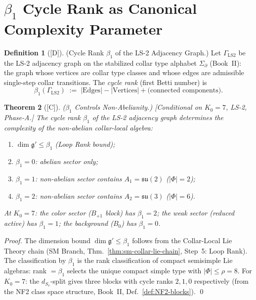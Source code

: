 \documentclass[12pt,oneside]{amsbook}
\theoremstyle{plain}
\newtheorem{theorem}{Theorem}[section]
\theoremstyle{definition}
\newtheorem{definition}[theorem]{Definition}
\theoremstyle{remark}
\newcommand{\status}[1]{\textup{[#1]}}
\begin{document}
\section{$\beta_1$ Cycle Rank as Canonical Complexity Parameter}
\label{sec:beta1}

\begin{definition}[\status{D}]\label{def:cycle-rank}
\textup{(Cycle Rank $\beta_1$ of the LS-2 Adjacency Graph.)}
Let $\Gamma_{\mathrm{LS2}}$ be the LS-2 adjacency graph on the
stabilized collar type alphabet $\Sigma_\partial$ (Book~II):
the graph whose vertices are collar type classes and whose edges
are admissible single-step collar transitions.  The
\emph{cycle rank} (first Betti number) is
\[
  \beta_1(\Gamma_{\mathrm{LS2}})
  \;:=\; |\mathrm{Edges}| - |\mathrm{Vertices}|
  + \text{(connected components)}.
\]
\end{definition}

\begin{theorem}[\status{C}]\label{thm:beta1-controls-nonabelian}
\textup{($\beta_1$ Controls Non-Abelianity.)}
\textup{[Conditional on $K_0=7$, LS-2, Phase-A.]}
The cycle rank $\beta_1$ of the LS-2 adjacency graph determines
the complexity of the non-abelian collar-local algebra:
\begin{enumerate}[label=\textup{(\arabic*)}]
  \item $\dim \mathfrak{g}' \leq \beta_1$ (Loop Rank bound);
  \item $\beta_1 = 0$: abelian sector only;
  \item $\beta_1 = 1$: non-abelian sector contains $A_1
    = \mathfrak{su}(2)$ ($|\Phi| = 2$);
  \item $\beta_1 = 2$: non-abelian sector contains $A_2
    = \mathfrak{su}(3)$ ($|\Phi| = 6$).
\end{enumerate}
At $K_0=7$: the color sector ($B_{+1}$ block) has $\beta_1 = 2$;
the weak sector (reduced active) has $\beta_1 = 1$; the
background ($B_0$) has $\beta_1 = 0$.
\end{theorem}

\begin{proof}
The dimension bound $\dim \mathfrak{g}' \leq \beta_1$ follows
from the Collar-Local Lie Theory chain (SM Branch,
Thm.~\ref{thm:sm-collar-lie-chain}, Step~5: Loop Rank).
The classification by $\beta_1$ is the rank classification of
compact semisimple Lie algebras: rank $= \beta_1$ selects
the unique compact simple type with $|\Phi| \leq \rho = 8$.
For $K_0=7$: the $d_{S_v}$-split gives three blocks with cycle
ranks $2, 1, 0$ respectively (from the NF2 class space structure,
Book~II, Def.~\ref{def:NF2-blocks}).
\qed
\end{proof}
\end{document}
